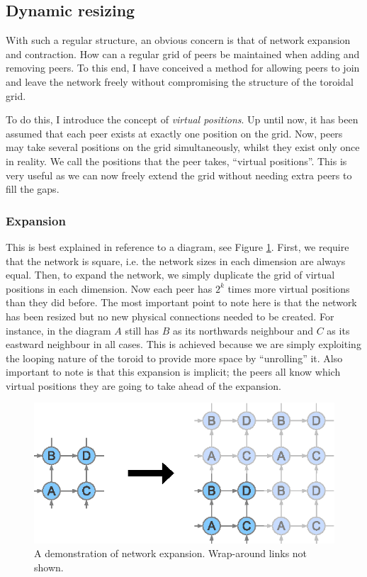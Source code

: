 \documentclass[ %
                    author={Luke Murray},
                supervisor={Dr. Simon Hollis},
                     title={Shadow Peer-to-Peer Networks},
                  subtitle={},
                    degree={MEng},
                      year={2013} ]{thesis}
\begin{document}
\subsection{Dynamic resizing}

With such a regular structure, an obvious concern is that of network expansion and contraction. How can a regular grid of peers be maintained when adding and removing peers. To this end, I have conceived a method for allowing peers to join and leave the network freely without compromising the structure of the toroidal grid.

To do this, I introduce the concept of {\em virtual positions}. Up until now, it has been assumed that each peer exists at exactly one position on the grid. Now, peers may take several positions on the grid simultaneously, whilst they exist only once in reality. We call the positions that the peer takes, ``virtual positions''. This is very useful as we can now freely extend the grid without needing extra peers to fill the gaps.

\subsubsection{Expansion}

This is best explained in reference to a diagram, see Figure \ref{expand}. First, we require that the network is square, i.e. the network sizes in each dimension are always equal. Then, to expand the network, we simply duplicate the grid of virtual positions in each dimension. Now each peer has $2^{k}$ times more virtual positions than they did before. The most important point to note here is that the network has been resized but no new physical connections needed to be created. For instance, in the diagram $A$ still has $B$ as its northwards neighbour and $C$ as its eastward neighbour in all cases. This is achieved because we are simply exploiting the looping nature of the toroid to provide more space by ``unrolling'' it. Also important to note is that this expansion is implicit; the peers all know which virtual positions they are going to take ahead of the expansion.

\begin{figure}[h]
    \centering
    \includegraphics{diagrams/network_expand.eps}
    \caption{A demonstration of network expansion. Wrap-around links not shown.}
    \label{expand}
\end{figure}
\end{document}
